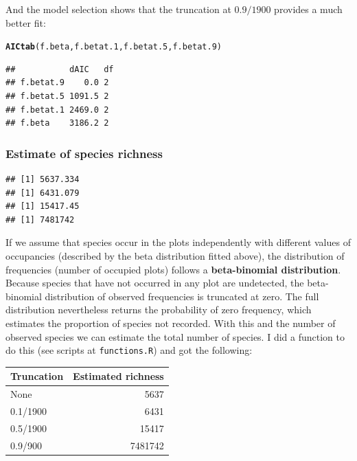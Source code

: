\documentclass[12pt, A4]{article}\usepackage[]{graphicx}\usepackage[]{color}
\makeatletter
\newcommand{\hlstd}[1]{\textcolor[rgb]{0.345,0.345,0.345}{#1}}%
\newcommand{\hlkwd}[1]{\textcolor[rgb]{0.737,0.353,0.396}{\textbf{#1}}}%
\newenvironment{kframe}{%
 \def\at@end@of@kframe{}%
 \ifinner\ifhmode%
  \def\at@end@of@kframe{\end{minipage}}%
  \begin{minipage}{\columnwidth}%
 \fi\fi%
 \def\FrameCommand##1{\hskip\@totalleftmargin \hskip-\fboxsep
 \colorbox{shadecolor}{##1}\hskip-\fboxsep
     \hskip-\linewidth \hskip-\@totalleftmargin \hskip\columnwidth}%
 \MakeFramed {\advance\hsize-\width
   \@totalleftmargin\z@ \linewidth\hsize
   \@setminipage}}%
 {\par\unskip\endMakeFramed%
 \at@end@of@kframe}
\newenvironment{knitrout}{}{} %
\makeatother
\begin{document}
And the model selection shows that the truncation at $0.9/1900$
provides a much better fit:

\begin{knitrout}
\color{fgcolor}\begin{kframe}
\begin{alltt}
\hlkwd{AICtab}\hlstd{(f.beta, f.betat.1, f.betat.5, f.betat.9)}
\end{alltt}
\begin{verbatim}
##           dAIC   df
## f.betat.9    0.0 2 
## f.betat.5 1091.5 2 
## f.betat.1 2469.0 2 
## f.beta    3186.2 2
\end{verbatim}
\end{kframe}
\end{knitrout}

\subsubsection*{Estimate of species richness}

\begin{knitrout}
\color{fgcolor}\begin{kframe}
\begin{verbatim}
## [1] 5637.334
## [1] 6431.079
## [1] 15417.45
## [1] 7481742
\end{verbatim}
\end{kframe}
\end{knitrout}

If we assume that species occur in the plots
independently with different values of occupancies
(described by the beta distribution fitted above),
the distribution of frequencies (number of occupied plots) 
follows a \textbf{beta-binomial distribution}. Because species that
have not occurred in any plot are undetected, 
the beta-binomial distribution
of observed frequencies is truncated at zero. 
The full distribution nevertheless returns the probability
of zero frequency, which estimates the proportion of species
not recorded. With this and the number of observed species we
can estimate the total number of species. I did a function
to do this (see scripts at \texttt{functions.R}) and
got the following:

\begin{knitrout}
\color{fgcolor}
\begin{tabular}{l|r}
\hline
Truncation & Estimated richness\\
\hline
None & 5637\\
\hline
0.1/1900 & 6431\\
\hline
0.5/1900 & 15417\\
\hline
0.9/900 & 7481742\\
\hline
\end{tabular}


\end{knitrout}
\end{document}
